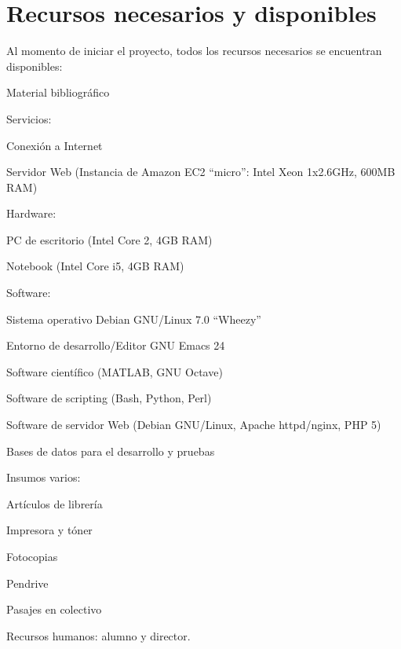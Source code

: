 \documentclass[12pt,bibliography=oldstyle,DIV=12,parskip=full-]{scrartcl}
\begin{document}
\section{Recursos necesarios y disponibles}
Al momento de iniciar el proyecto, todos los recursos necesarios se
encuentran disponibles:
\begin{itemize*}
\item Material bibliográfico
\item Servicios:
  \begin{itemize*}
  \item Conexión a Internet
  \item Servidor Web (Instancia de Amazon EC2 ``micro'': Intel Xeon
    1x2.6GHz, 600MB RAM)
  \end{itemize*}
\item Hardware:
  \begin{itemize*}
  \item PC de escritorio (Intel Core 2, 4GB RAM)
  \item Notebook (Intel Core i5, 4GB RAM)
  \end{itemize*}
\item Software:
  \begin{itemize*}
  \item Sistema operativo Debian GNU/Linux 7.0 ``Wheezy''
  \item Entorno de desarrollo/Editor GNU Emacs 24
  \item Software científico (MATLAB, GNU Octave)
  \item Software de scripting (Bash, Python, Perl)
  \item Software de servidor Web (Debian GNU/Linux, Apache
    httpd/nginx, PHP 5)
  \end{itemize*}
\item Bases de datos para el desarrollo y pruebas
\item Insumos varios:
  \begin{itemize*}
  \item Artículos de librería
  \item Impresora y tóner
  \item Fotocopias
  \item Pendrive
  \item Pasajes en colectivo
  \end{itemize*}
\item Recursos humanos: alumno y director.
\end{itemize*}
%
%
\newpage
\end{document}
